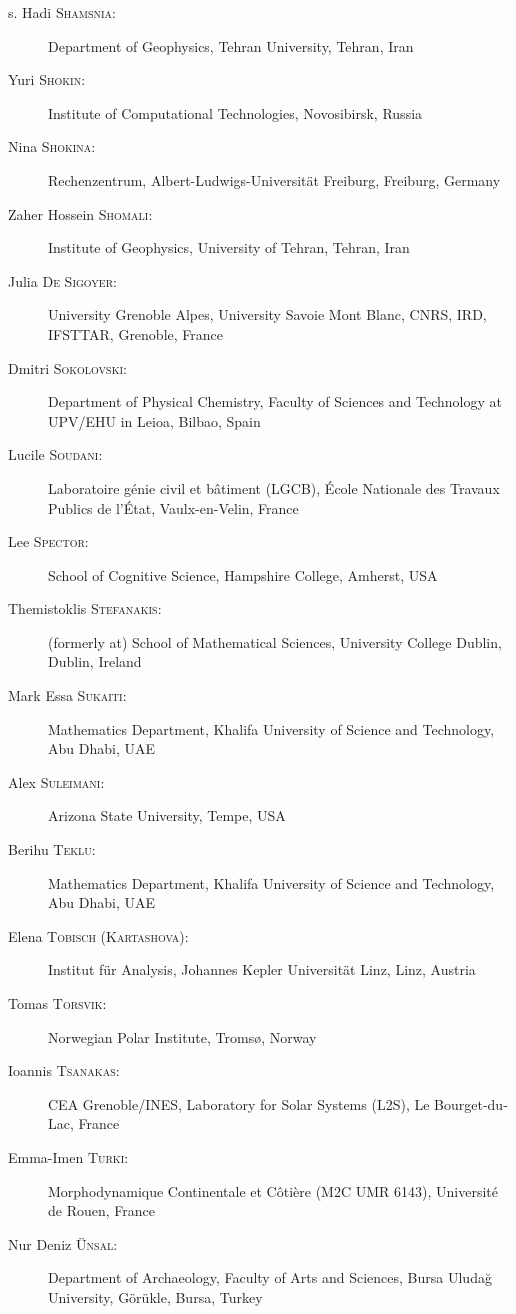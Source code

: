 \documentclass[final, a4paper, oneside, 12pt]{article}
\numberwithin{equation}{section}
\begin{document}
\begin{description}
  \item[s. Hadi \textsc{Shamsnia}:] Department of Geophysics, Tehran University, Tehran, Iran
  \item[Yuri \textsc{Shokin}:] Institute of Computational Technologies, Novosibirsk, Russia
  \item[Nina \textsc{Shokina}:] Rechenzentrum, Albert-Ludwigs-Universit\"at Freiburg, Freiburg, Germany
  \item[Zaher Hossein \textsc{Shomali}:] Institute of Geophysics, University of Tehran, Tehran, Iran
  \item[Julia \textsc{De Sigoyer}:] University Grenoble Alpes, University Savoie Mont Blanc, CNRS, IRD, IFSTTAR, Grenoble, France
  \item[Dmitri \textsc{Sokolovski}:] Department of Physical Chemistry, Faculty of Sciences and Technology at UPV/EHU in Leioa, Bilbao, Spain
  \item[Lucile \textsc{Soudani}:] Laboratoire g\'enie civil et b\^atiment (LGCB), \'Ecole Nationale des Travaux Publics de l'\'Etat, Vaulx-en-Velin, France
  \item[Lee \textsc{Spector}:] School of Cognitive Science, Hampshire College, Amherst, USA
  \item[Themistoklis \textsc{Stefanakis}:] (formerly at) School of Mathematical Sciences, University College Dublin, Dublin, Ireland
  \item[Mark Essa \textsc{Sukaiti}:] Mathematics Department, Khalifa University of Science and Technology, Abu Dhabi, UAE
  \item[Alex \textsc{Suleimani}:] Arizona State University, Tempe, USA
  \item[Berihu \textsc{Teklu}:] Mathematics Department, Khalifa University of Science and Technology, Abu Dhabi, UAE
  \item[Elena \textsc{Tobisch} (\textsc{Kartashova}):] Institut f\"ur Analysis, Johannes Kepler Universit\"at Linz, Linz, Austria
  \item[Tomas \textsc{Torsvik}:] Norwegian Polar Institute, Troms\o, Norway
  \item[Ioannis \textsc{Tsanakas}:] CEA Grenoble/INES, Laboratory for Solar Systems (L2S), Le Bourget-du-Lac, France
  \item[Emma-Imen \textsc{Turki}:] Morphodynamique Continentale et C\^oti\`ere (M2C UMR 6143), Universit\'e de Rouen, France
  \item[Nur Deniz \textsc{\"Unsal}:] Department of Archaeology, Faculty of Arts and Sciences, Bursa Uluda\u{g} University, G\"or\"ukle, Bursa, Turkey

\end{description}
\end{document}

